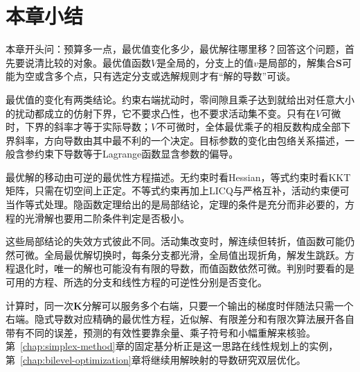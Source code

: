 \section{本章小结}
\label{sec:sens-summary}

本章开头问：预算多一点，最优值变化多少，最优解往哪里移？回答这个问题，首先要说清比较的对象。最优值函数$V$是全局的，分支上的值$v$是局部的，解集合$\bm{S}$可能为空或含多个点，只有选定分支或选解规则才有“解的导数”可谈。

最优值的变化有两类结论。约束右端扰动时，零间隙且乘子达到就给出对任意大小的扰动都成立的仿射下界，它不要求凸性，也不要求活动集不变。只有在$V$可微时，下界的斜率才等于实际导数；$V$不可微时，全体最优乘子的相反数构成全部下界斜率，方向导数由其中最不利的一个决定。目标参数的变化由包络关系描述，一般含参约束下导数等于Lagrange函数显含参数的偏导。

最优解的移动由可逆的最优性方程描述。无约束时看Hessian，等式约束时看KKT矩阵，只需在切空间上正定。不等式约束再加上LICQ与严格互补，活动约束便可当作等式处理。隐函数定理给出的是局部结论，定理的条件是充分而非必要的，方程的光滑解也要用二阶条件判定是否极小。

这些局部结论的失效方式彼此不同。活动集改变时，解连续但转折，值函数可能仍然可微。全局最优解切换时，每条分支都光滑，全局值出现折角，解发生跳跃。方程退化时，唯一的解也可能没有有限的导数，而值函数依然可微。判别时要看的是可用的方程、所选的分支和线性方程的可逆性分别是否变化。

计算时，同一次$\bm{K}$分解可以服务多个右端，只要一个输出的梯度时伴随法只需一个右端。隐式导数对应精确的最优性方程，近似解、有限差分和有限次算法展开各自带有不同的误差，预测的有效性要靠余量、乘子符号和小幅重解来核验。第~\ref{chap:simplex-method}章的固定基分析正是这一思路在线性规划上的实例，第~\ref{chap:bilevel-optimization}章将继续用解映射的导数研究双层优化。
